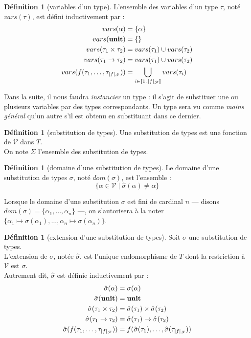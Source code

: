 \documentclass[a4paper]{report}
\theoremstyle{definition}
\newtheorem{definition}[theoreme]{Définition}
\newcommand{\unit}{\bold{unit}}
\newcommand{\interval}[2]{[\![#1\,;#2]\!]}
\newcommand{\V}{\mathscr V}
\newcommand{\F}{\mathscr F}
\begin{document}
\begin{definition}[variables d'un type]
	L'ensemble des variables d'un type $\tau$, noté $vars (\tau)$, est défini inductivement par :
	\begin{align*}
			vars (\alpha) &=
			\{ \alpha \}
		\\
			vars (\unit) &=
			\{ \}
		\\
			vars (\tau_1 \times \tau_2) &=
			vars (\tau_1) \cup vars (\tau_2)
		\\
			vars (\tau_1 \rightarrow \tau_2) &=
			vars (\tau_1) \cup vars (\tau_2)
		\\
			vars (f (\tau_1, \dots, \tau_{|f|_\F})) &=
			\bigcup_{i \in \interval 1 {|f|_\F}} vars (\tau_i)
	\end{align*}
\end{definition}

Dans la suite, il nous faudra \emph{instancier} un type : il s'agit de substituer une ou plusieurs variables par des types correspondants. Un type sera vu comme \emph{moins général} qu'un autre s'il est obtenu en substituant dans ce dernier.

\begin{definition}[substitution de types]
	Une substitution de types est une fonction de $\V$ dans $T$. \\
	On note $\Sigma$ l'ensemble des substitution de types.
\end{definition}

\begin{definition}[domaine d'une substitution de types]
	Le domaine d'une substitution de types $\sigma$, noté $dom (\sigma)$, est l'ensemble :
	\[ \{ \alpha \in \V \mid \hat \sigma (\alpha) \neq \alpha \} \]
\end{definition}

Lorsque le domaine d'une substitution $\sigma$ est fini de cardinal $n$ — disons $dom (\sigma) = \{ \alpha_1, \dots, \alpha_n \}$ —, on s'autorisera à la noter $\{ \alpha_1 \mapsto \sigma (\alpha_1), \dots, \alpha_n \mapsto \sigma (\alpha_n) \}$.

\begin{definition}[extension d'une substitution de types]
	Soit $\sigma$ une substitution de types. \\
	L'extension de $\sigma$, notée $\hat \sigma$, est l'unique endomorphisme de $T$ dont la restriction à $\V$ est $\sigma$. \\
	Autrement dit, $\hat \sigma$ est définie inductivement par :
	\begin{align*}
			\hat \sigma (\alpha) &=
			\sigma (\alpha)
		\\
			\hat \sigma (\unit) &=
			\unit
		\\
			\hat \sigma (\tau_1 \times \tau_2) &=
			\hat \sigma (\tau_1) \times \hat \sigma (\tau_2)
		\\
			\hat \sigma (\tau_1 \rightarrow \tau_2) &=
			\hat \sigma (\tau_1) \rightarrow \hat \sigma (\tau_2)
		\\
			\hat \sigma (f (\tau_1, \dots, \tau_{|f|_\F})) &=
			f (\hat \sigma (\tau_1), \dots, \hat \sigma (\tau_{|f|_\F}))
	\end{align*}
\end{definition}
\end{document}
